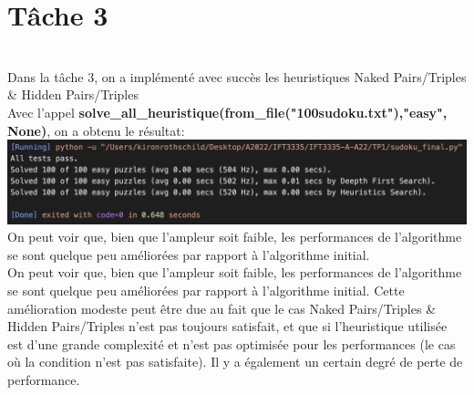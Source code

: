 \documentclass{article}
\begin{document}
\section*{Tâche 3}\\
Dans la tâche 3, on a implémenté avec succès les heuristiques Naked Pairs/Triples \& Hidden Pairs/Triples\\
Avec l'appel \textbf{solve\_all\_heuristique(from\_file("100sudoku.txt"),"easy", None)}, on a obtenu le résultat:\\
\includegraphics[width=1\textwidth]{t3.png}\\
On peut voir que, bien que l'ampleur soit faible, les performances de l'algorithme se sont quelque peu améliorées par rapport à l'algorithme initial.\\
On peut voir que, bien que l'ampleur soit faible, les performances de l'algorithme se sont quelque peu améliorées par rapport à l'algorithme initial. Cette amélioration modeste peut être due au fait que le cas Naked Pairs/Triples \& Hidden Pairs/Triples n'est pas toujours satisfait, et que si l'heuristique utilisée est d'une grande complexité et n'est pas optimisée pour les performances (le cas où la condition n'est pas satisfaite). Il y a également un certain degré de perte de performance.
\end{document}
